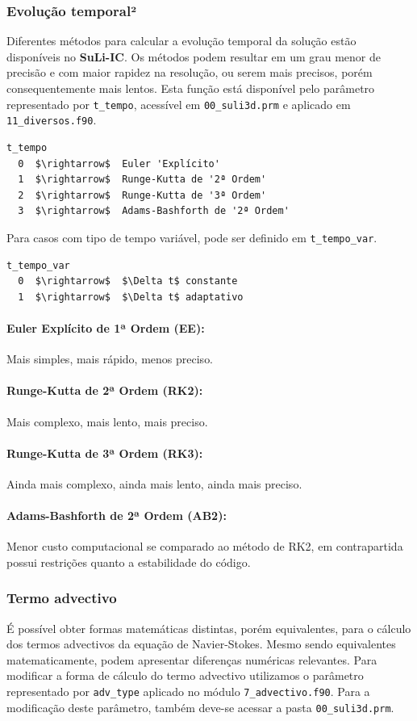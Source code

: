 \documentclass[12pt, a4paper]{article}
\newcommand{\SLIC}{{\bf SuLi-IC}}
\begin{document}
\subsubsection{Evolução temporal²}
Diferentes métodos para calcular a evolução temporal da solução estão disponíveis no \SLIC. Os métodos podem resultar em um grau menor de precisão e com maior rapidez na resolução, ou serem mais precisos, porém consequentemente mais lentos. Esta função está disponível pelo parâmetro representado por \verb|t_tempo|, acessível em \verb|00_suli3d.prm| e aplicado em \verb|11_diversos.f90|.

\begin{lstlisting}[escapeinside='']
t_tempo	
  0  $\rightarrow$  Euler 'Explícito'
  1  $\rightarrow$  Runge-Kutta de '2ª Ordem'
  2  $\rightarrow$  Runge-Kutta de '3ª Ordem'
  3  $\rightarrow$  Adams-Bashforth de '2ª Ordem'
\end{lstlisting}

Para casos com tipo de tempo variável, pode ser definido em \verb|t_tempo_var|.

\begin{lstlisting}[escapeinside='']
t_tempo_var	
  0  $\rightarrow$  $\Delta t$ constante
  1  $\rightarrow$  $\Delta t$ adaptativo	
\end{lstlisting}

\paragraph{Euler Explícito de 1ª Ordem (EE):} Mais simples, mais rápido, menos preciso.
\paragraph{Runge-Kutta de 2ª Ordem (RK2):} Mais complexo, mais lento, mais preciso.
\paragraph{Runge-Kutta de 3ª Ordem (RK3):} Ainda mais complexo, ainda mais lento, ainda mais preciso.
\paragraph{Adams-Bashforth de 2ª Ordem (AB2):} Menor custo computacional se comparado ao método de RK2, em contrapartida possui restrições quanto a estabilidade do código.

\subsubsection{Termo advectivo}
É possível obter formas matemáticas distintas, porém equivalentes, para o cálculo dos termos advectivos da equação de Navier-Stokes. Mesmo sendo equivalentes matematicamente, podem apresentar diferenças numéricas relevantes. Para modificar a forma de cálculo do termo advectivo utilizamos o parâmetro representado por \verb|adv_type| aplicado no módulo \verb|7_advectivo.f90|. Para a modificação deste parâmetro, também deve-se acessar a pasta \verb|00_suli3d.prm|.
\end{document}

